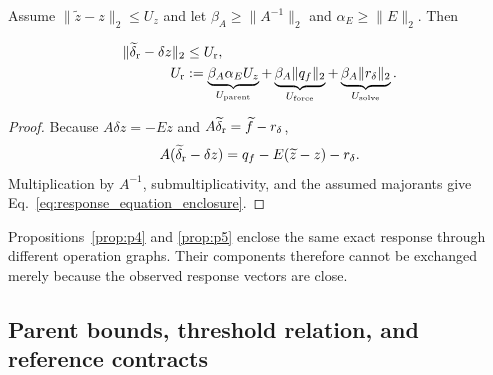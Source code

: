 \begin{proposition}
\label{prop:p5}
Assume $\lVert\widetilde z-z\rVert_2\leq U_z$ and let
$\beta_A\geq\lVert A^{-1}\rVert_2$ and
$\alpha_E\geq\lVert E\rVert_2$. Then
\begin{linenomath*}
\begin{equation}
\begin{aligned}
\lVert\widetilde\delta_{\rm r}-\delta z\rVert_2
&\leq U_{\rm r},\\
U_{\rm r}
&:=\underbrace{\beta_A\alpha_EU_z}_{U_{\rm parent}}
+\underbrace{\beta_A\lVert q_f\rVert_2}_{U_{\rm force}}
+\underbrace{\beta_A\lVert r_\delta\rVert_2}_{U_{\rm solve}}.
\end{aligned}
\label{eq:response_equation_enclosure}
\end{equation}
\end{linenomath*}
\end{proposition}

\begin{proof}
Because $A\delta z=-Ez$ and
$A\widetilde\delta_{\rm r}=\widetilde f-r_\delta$,
\[
A(\widetilde\delta_{\rm r}-\delta z)
=q_f-E(\widetilde z-z)-r_\delta .
\]
Multiplication by $A^{-1}$, submultiplicativity, and the assumed majorants
give Eq.~\eqref{eq:response_equation_enclosure}.
\end{proof}

Propositions~\ref{prop:p4} and \ref{prop:p5} enclose the same exact
response through different operation graphs. Their components therefore
cannot be exchanged merely because the observed response vectors are close.

\subsection{Parent bounds, threshold relation, and reference contracts}

